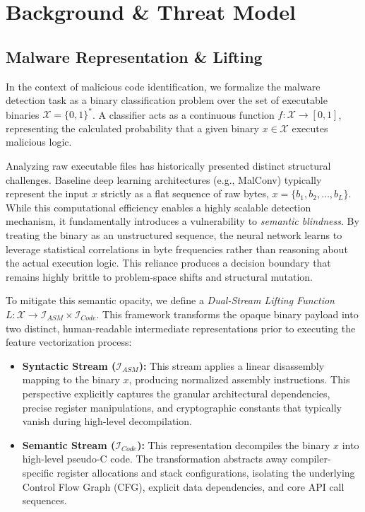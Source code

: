 \documentclass[pdflatex,sn-mathphys-num]{sn-jnl}
\begin{document}
\section{Background \& Threat Model}
\label{sec:threat_model}

\subsection{Malware Representation \& Lifting}
\label{sec:bg_representation}
In the context of malicious code identification, we formalize the malware detection task as a binary classification problem over the set of executable binaries $\mathcal{X} = \{0, 1\}^*$. A classifier acts as a continuous function $f: \mathcal{X} \rightarrow [0, 1]$, representing the calculated probability that a given binary $x \in \mathcal{X}$ executes malicious logic.

Analyzing raw executable files has historically presented distinct structural challenges. Baseline deep learning architectures (e.g., MalConv) typically represent the input $x$ strictly as a flat sequence of raw bytes, $x = \{b_1, b_2, \dots, b_L\}$. While this computational efficiency enables a highly scalable detection mechanism, it fundamentally introduces a vulnerability to \textit{semantic blindness}. By treating the binary as an unstructured sequence, the neural network learns to leverage statistical correlations in byte frequencies rather than reasoning about the actual execution logic. This reliance produces a decision boundary that remains highly brittle to problem-space shifts and structural mutation.

To mitigate this semantic opacity, we define a \textit{Dual-Stream Lifting Function} $L: \mathcal{X} \rightarrow \mathcal{I}_{ASM} \times \mathcal{I}_{Code}$. This framework transforms the opaque binary payload into two distinct, human-readable intermediate representations prior to executing the feature vectorization process:
\begin{itemize}
    \item \textbf{Syntactic Stream ($\mathcal{I}_{ASM}$):} This stream applies a linear disassembly mapping to the binary $x$, producing normalized assembly instructions. This perspective explicitly captures the granular architectural dependencies, precise register manipulations, and cryptographic constants that typically vanish during high-level decompilation.
    \item \textbf{Semantic Stream ($\mathcal{I}_{Code}$):} This representation decompiles the binary $x$ into high-level pseudo-C code. The transformation abstracts away compiler-specific register allocations and stack configurations, isolating the underlying Control Flow Graph (CFG), explicit data dependencies, and core API call sequences.
\end{itemize}
\end{document}
